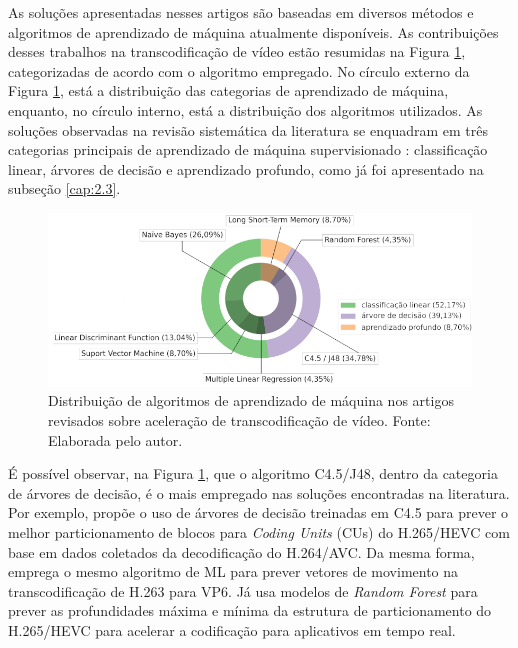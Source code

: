 As soluções apresentadas nesses artigos são baseadas em diversos métodos e algoritmos de aprendizado de máquina atualmente disponíveis. As contribuições desses trabalhos na transcodificação de vídeo estão resumidas na Figura \ref{fig:13}, categorizadas de acordo com o algoritmo empregado. No círculo externo da Figura \ref{fig:13}, está a distribuição das categorias de aprendizado de máquina, enquanto, no círculo interno, está a distribuição dos algoritmos utilizados. As soluções observadas na revisão sistemática da literatura se enquadram em três categorias principais de aprendizado de máquina supervisionado \cite{bib:livroKubat}: classificação linear, árvores de decisão e aprendizado profundo, como já foi apresentado na subseção \ref{cap:2.3}.

\begin{figure}
    \centering
    \includegraphics[width=\textwidth]{FIGURES/fig_13.png}
    \caption{Distribuição de algoritmos de aprendizado de máquina nos artigos revisados sobre aceleração de transcodificação de vídeo. Fonte: Elaborada pelo autor.}
    \label{fig:13}
\end{figure}

É possível observar, na Figura \ref{fig:13}, que o algoritmo C4.5/J48, dentro da categoria de árvores de decisão, é o mais empregado nas soluções encontradas na literatura. Por exemplo, \citet{bib:correa_2016} propõe o uso de árvores de decisão treinadas em C4.5 para prever o melhor particionamento de blocos para \textit{Coding Units} (CUs) do H.265/HEVC com base em dados coletados da decodificação do H.264/AVC. Da mesma forma, \citet{bib:escribano3_2008} emprega o mesmo algoritmo de ML para prever vetores de movimento na transcodificação de H.263 para VP6. Já \citet{bib:grellert_2018} usa modelos de \textit{Random Forest} para prever as profundidades máxima e mínima da estrutura de particionamento do H.265/HEVC para acelerar a codificação para aplicativos em tempo real.

